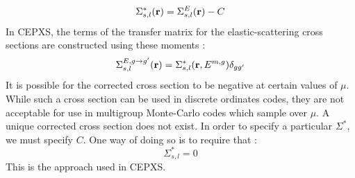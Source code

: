 \begin{equation}
\Sigma_{s,l}^*(\mathbf{r}) = \Sigma_{s,l}^E(\mathbf{r})- C
\end{equation}
In CEPXS, the terms of the transfer matrix for the elastic-scattering cross
sections are constructed using these moments :
\begin{equation}
\Sigma_{s,l}^{E,g\rightarrow g'}(\mathbf{r}) =
\Sigma_{s,l}^{*}(\mathbf{r},E^{m,g})\delta_{gg'}
\end{equation}
It is possible for the corrected cross section to be negative at certain
values of $\mu$. While such a cross section can be used in discrete ordinates
codes, they are not acceptable for use in multigroup Monte-Carlo codes which
sample over $\mu$. A unique corrected cross section does not exist. In order
to specify a particular $\Sigma^*$, we must specify $C$. One way of doing so
is to require that :
\begin{equation}
\Sigma_{s,l}^* =0
\end{equation}
This is the approach used in CEPXS.

